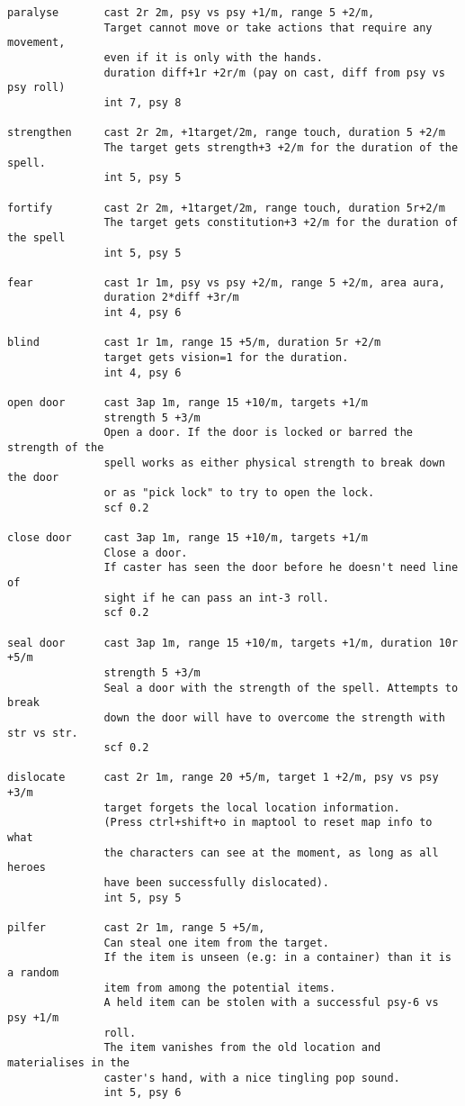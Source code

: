 \begin{verbatim}
paralyse       cast 2r 2m, psy vs psy +1/m, range 5 +2/m,
               Target cannot move or take actions that require any movement,
               even if it is only with the hands.
               duration diff+1r +2r/m (pay on cast, diff from psy vs psy roll)
               int 7, psy 8

strengthen     cast 2r 2m, +1target/2m, range touch, duration 5 +2/m
               The target gets strength+3 +2/m for the duration of the spell.
               int 5, psy 5

fortify        cast 2r 2m, +1target/2m, range touch, duration 5r+2/m
               The target gets constitution+3 +2/m for the duration of the spell
               int 5, psy 5

fear           cast 1r 1m, psy vs psy +2/m, range 5 +2/m, area aura,
               duration 2*diff +3r/m
               int 4, psy 6

blind          cast 1r 1m, range 15 +5/m, duration 5r +2/m
               target gets vision=1 for the duration.
               int 4, psy 6

open door      cast 3ap 1m, range 15 +10/m, targets +1/m
               strength 5 +3/m
               Open a door. If the door is locked or barred the strength of the
               spell works as either physical strength to break down the door
               or as "pick lock" to try to open the lock.
               scf 0.2

close door     cast 3ap 1m, range 15 +10/m, targets +1/m
               Close a door.
               If caster has seen the door before he doesn't need line of 
               sight if he can pass an int-3 roll.
               scf 0.2

seal door      cast 3ap 1m, range 15 +10/m, targets +1/m, duration 10r +5/m
               strength 5 +3/m
               Seal a door with the strength of the spell. Attempts to break
               down the door will have to overcome the strength with str vs str.
               scf 0.2

dislocate      cast 2r 1m, range 20 +5/m, target 1 +2/m, psy vs psy +3/m
               target forgets the local location information.
               (Press ctrl+shift+o in maptool to reset map info to what
               the characters can see at the moment, as long as all heroes
               have been successfully dislocated).
               int 5, psy 5

pilfer         cast 2r 1m, range 5 +5/m,
               Can steal one item from the target.
               If the item is unseen (e.g: in a container) than it is a random
               item from among the potential items.
               A held item can be stolen with a successful psy-6 vs psy +1/m
               roll.
               The item vanishes from the old location and materialises in the
               caster's hand, with a nice tingling pop sound.
               int 5, psy 6


\end{verbatim}
